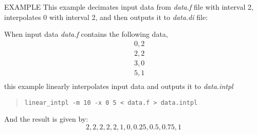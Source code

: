 \begin{qsection}{EXAMPLE}
This example decimates input data from {\em data.f} file with interval 2,
interpolates 0 with interval 2, and then outputs it to {\em
data.di} file:

When input data {\em data.f} contains the following data,
\begin{eqnarray*}
&& 0, 2 \nonumber \\
&& 2, 2 \nonumber \\
&& 3, 0   \\
&& 5, 1 \nonumber \\
\end{eqnarray*}
this example linearly interpolates input data and outputs it to {\em data.intpl}
\begin{quote}
 \verb!linear_intpl -m 10 -x 0 5 < data.f > data.intpl!
\end{quote}
And the result is given by:
\begin{displaymath}
2, 2, 2, 2, 2, 1, 0, 0.25, 0.5, 0.75, 1
\end{displaymath}
\end{qsection}
% 
